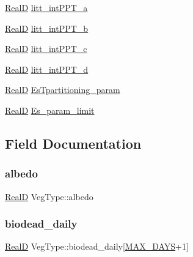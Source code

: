 \begin{DoxyCompactItemize}
\item 
\hyperlink{generic_8h_af1c105fd5732f70b91ddaeda0cc340e3}{RealD} \hyperlink{struct_veg_type_a58f4245dbf2862ea99e77c98744a00dd}{litt\+\_\+int\+P\+P\+T\+\_\+a}
\item 
\hyperlink{generic_8h_af1c105fd5732f70b91ddaeda0cc340e3}{RealD} \hyperlink{struct_veg_type_ac771ad7e7dfab92b5ddcd6f5332b7bf2}{litt\+\_\+int\+P\+P\+T\+\_\+b}
\item 
\hyperlink{generic_8h_af1c105fd5732f70b91ddaeda0cc340e3}{RealD} \hyperlink{struct_veg_type_ab40333654c3536f7939ae1865a7feac4}{litt\+\_\+int\+P\+P\+T\+\_\+c}
\item 
\hyperlink{generic_8h_af1c105fd5732f70b91ddaeda0cc340e3}{RealD} \hyperlink{struct_veg_type_a7b43bc786d7b25661a4a99e55f96bd9d}{litt\+\_\+int\+P\+P\+T\+\_\+d}
\item 
\hyperlink{generic_8h_af1c105fd5732f70b91ddaeda0cc340e3}{RealD} \hyperlink{struct_veg_type_a9a14971307084c7b7d2ae702cf9f7a7b}{Es\+Tpartitioning\+\_\+param}
\item 
\hyperlink{generic_8h_af1c105fd5732f70b91ddaeda0cc340e3}{RealD} \hyperlink{struct_veg_type_ac93ec2505d567932f523ec92b793920f}{Es\+\_\+param\+\_\+limit}
\end{DoxyCompactItemize}


\subsection{Field Documentation}
\mbox{\label{struct_veg_type_ac0050a00f702961caa7fead3d25485e9}} 
\subsubsection{\texorpdfstring{albedo}{albedo}}
{\footnotesize\ttfamily \hyperlink{generic_8h_af1c105fd5732f70b91ddaeda0cc340e3}{RealD} Veg\+Type\+::albedo}

\mbox{\label{struct_veg_type_a086af132e9ff5bd76be61b4845ca50b2}} 
\subsubsection{\texorpdfstring{biodead\+\_\+daily}{biodead\_daily}}
{\footnotesize\ttfamily \hyperlink{generic_8h_af1c105fd5732f70b91ddaeda0cc340e3}{RealD} Veg\+Type\+::biodead\+\_\+daily\mbox{[}\hyperlink{_times_8h_a01f08d46080872b9f4284873b7f9dee4}{M\+A\+X\+\_\+\+D\+A\+YS}+1\mbox{]}}

